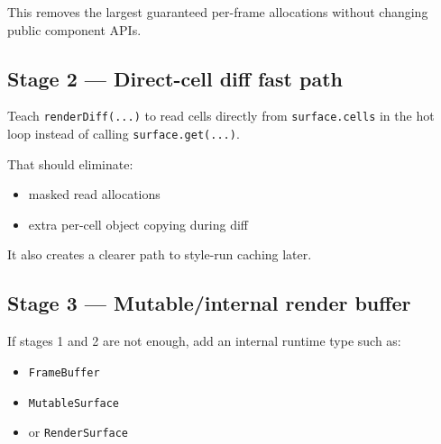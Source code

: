 This removes the largest guaranteed per-frame allocations without changing public component APIs.

\subsection{Stage 2 --- Direct-cell diff fast path}\label{record-052-stage-2-direct-cell-diff-fast-path}

Teach \texttt{r\allowbreak{}e\allowbreak{}n\allowbreak{}d\allowbreak{}e\allowbreak{}r\allowbreak{}D\allowbreak{}i\allowbreak{}f\allowbreak{}f\allowbreak{}(\allowbreak{}.\allowbreak{}.\allowbreak{}.\allowbreak{})} to read cells directly from \texttt{s\allowbreak{}u\allowbreak{}r\allowbreak{}f\allowbreak{}a\allowbreak{}c\allowbreak{}e\allowbreak{}.\allowbreak{}c\allowbreak{}e\allowbreak{}l\allowbreak{}l\allowbreak{}s} in the hot loop instead of calling \texttt{s\allowbreak{}u\allowbreak{}r\allowbreak{}f\allowbreak{}a\allowbreak{}c\allowbreak{}e\allowbreak{}.\allowbreak{}g\allowbreak{}e\allowbreak{}t\allowbreak{}(\allowbreak{}.\allowbreak{}.\allowbreak{}.\allowbreak{})}.

That should eliminate:

\begin{itemize}
\tightlist
\item
  masked read allocations
\item
  extra per-cell object copying during diff
\end{itemize}

It also creates a clearer path to style-run caching later.

\subsection{Stage 3 --- Mutable/internal render buffer}\label{record-052-stage-3-mutableinternal-render-buffer}

If stages 1 and 2 are not enough, add an internal runtime type such as:

\begin{itemize}
\tightlist
\item
  \texttt{F\allowbreak{}r\allowbreak{}a\allowbreak{}m\allowbreak{}e\allowbreak{}B\allowbreak{}u\allowbreak{}f\allowbreak{}f\allowbreak{}e\allowbreak{}r}
\item
  \texttt{M\allowbreak{}u\allowbreak{}t\allowbreak{}a\allowbreak{}b\allowbreak{}l\allowbreak{}e\allowbreak{}S\allowbreak{}u\allowbreak{}r\allowbreak{}f\allowbreak{}a\allowbreak{}c\allowbreak{}e}
\item
  or \texttt{R\allowbreak{}e\allowbreak{}n\allowbreak{}d\allowbreak{}e\allowbreak{}r\allowbreak{}S\allowbreak{}u\allowbreak{}r\allowbreak{}f\allowbreak{}a\allowbreak{}c\allowbreak{}e}
\end{itemize}

